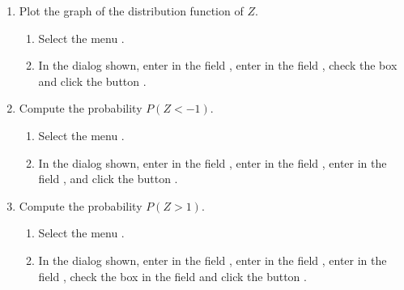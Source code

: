 \begin{enumerate}[leftmargin=*]
\begin{enumerate}
\item Plot the graph of the distribution function of $Z$.
\begin{indication}
\begin{enumerate}
\item Select the menu .
\item In the dialog shown, enter  in the field , enter  in the field , check the box  and click the button .
\end{enumerate}
\end{indication}

\item Compute the probability $P(Z<-1)$. 
\begin{indication}
\begin{enumerate}
\item Select the menu .
\item In the dialog shown, enter  in the field , enter  in the field , enter  in the field , and click the button .
\end{enumerate}
\end{indication}

\item Compute the probability $P(Z>1)$. 
\begin{indication}
\begin{enumerate}
\item Select the menu .
\item In the dialog shown, enter  in the field , enter  in the field , enter  in the field , check the box  in the field  and click the button .
\end{enumerate}
\end{indication}


\end{enumerate}
\end{enumerate}
